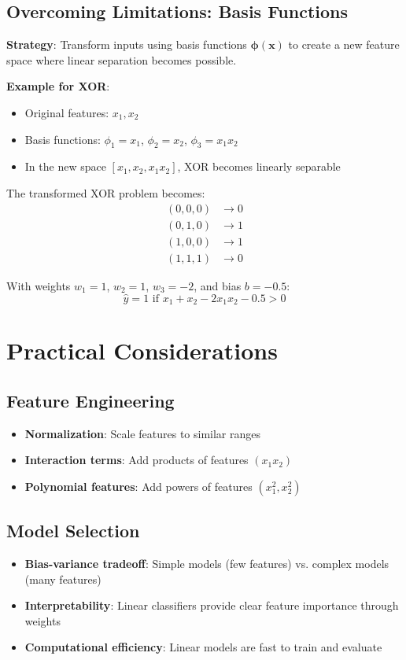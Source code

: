 \subsection{Overcoming Limitations: Basis Functions}

\textbf{Strategy}: Transform inputs using basis functions $\bm{\phi}(\bm{x})$ to create a new feature space where linear separation becomes possible.

\textbf{Example for XOR}:
\begin{itemize}
    \item Original features: $x_1, x_2$
    \item Basis functions: $\phi_1 = x_1$, $\phi_2 = x_2$, $\phi_3 = x_1 x_2$
    \item In the new space $[x_1, x_2, x_1 x_2]$, XOR becomes linearly separable
\end{itemize}

The transformed XOR problem becomes:
\begin{align}
(0,0,0) &\rightarrow 0 \\
(0,1,0) &\rightarrow 1 \\
(1,0,0) &\rightarrow 1 \\
(1,1,1) &\rightarrow 0
\end{align}

With weights $w_1 = 1$, $w_2 = 1$, $w_3 = -2$, and bias $b = -0.5$:
\begin{equation}
\hat{y} = 1 \text{ if } x_1 + x_2 - 2x_1x_2 - 0.5 > 0
\end{equation}

\section{Practical Considerations}

\subsection{Feature Engineering}
\begin{itemize}
    \item \textbf{Normalization}: Scale features to similar ranges
    \item \textbf{Interaction terms}: Add products of features $(x_1 x_2)$
    \item \textbf{Polynomial features}: Add powers of features $(x_1^2, x_2^2)$
\end{itemize}

\subsection{Model Selection}
\begin{itemize}
    \item \textbf{Bias-variance tradeoff}: Simple models (few features) vs. complex models (many features)
    \item \textbf{Interpretability}: Linear classifiers provide clear feature importance through weights
    \item \textbf{Computational efficiency}: Linear models are fast to train and evaluate
\end{itemize}

